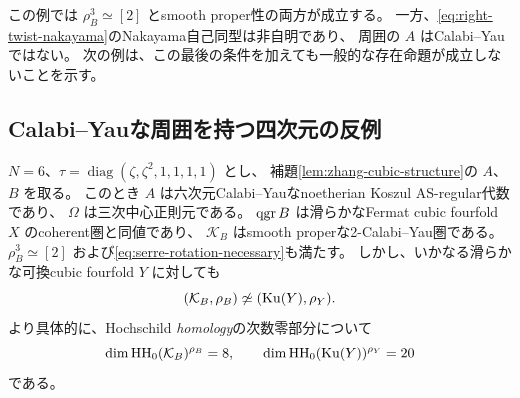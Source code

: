 \begin{remark}
 この例では \(\rho_B^3\simeq[2]\) とsmooth proper性の両方が成立する。
 一方、\eqref{eq:right-twist-nakayama}のNakayama自己同型は非自明であり、
 周囲の \(A\) はCalabi--Yauではない。
 次の例は、この最後の条件を加えても一般的な存在命題が成立しないことを示す。
\end{remark}

\subsection{Calabi--Yauな周囲を持つ四次元の反例}

\begin{theorem}
\label{thm:zhang-cy-fourfold-counterexample}
 \(N=6\)、\(\tau=\operatorname{diag}(\zeta,\zeta^2,1,1,1,1)\) とし、
 補題\ref{lem:zhang-cubic-structure}の \(A\)、\(B\) を取る。
 このとき \(A\) は六次元Calabi--Yauなnoetherian Koszul AS-regular代数であり、
 \(\Omega\) は三次中心正則元である。
 \(\operatorname{qgr} B\) は滑らかなFermat cubic fourfold \(X\) のcoherent圏と同値であり、
 \(\mathcal K_B\) はsmooth properな2-Calabi--Yau圏である。
 \(\rho_B^3\simeq[2]\) および\eqref{eq:serre-rotation-necessary}も満たす。
 しかし、いかなる滑らかな可換cubic fourfold \(Y\) に対しても
 \[
 (\mathcal K_B,\rho_B)\not\simeq(\operatorname{Ku}(Y),\rho_Y).
 \]
 より具体的に、Hochschild \emph{homology}の次数零部分について
 \begin{equation}\label{eq:cy-fourfold-hh0-obstruction}
 \dim\operatorname{HH}_0(\mathcal K_B)^{\rho_B}=8,
 \qquad
 \dim\operatorname{HH}_0(\operatorname{Ku}(Y))^{\rho_Y}=20
 \end{equation}
 である。
\end{theorem}
